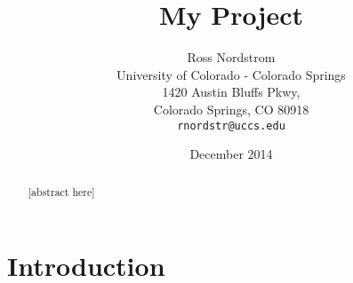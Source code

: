 \documentclass{sig-alternate}
\begin{document}
\title{My Project}
\author{Ross Nordstrom\\
        University of Colorado - Colorado Springs\\
        1420 Austin Bluffs Pkwy,\\
        Colorado Springs, CO 80918\\
        \texttt{rnordstr@uccs.edu}
       }
\date{December 2014}

\maketitle

\begin{abstract}
   [abstract here]
\end{abstract}


\section{Introduction}








{}

\end{document}
